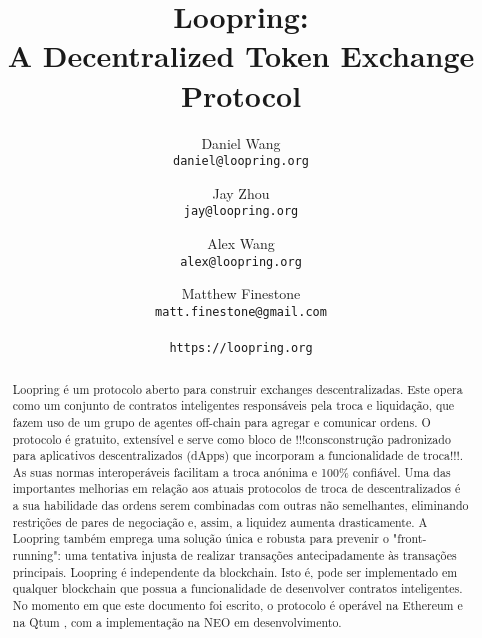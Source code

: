 \documentclass[UTF8,nofonts]{article}
\title{\textbf{Loopring:}\\\textbf{A Decentralized Token Exchange Protocol}}
\author{
  Daniel Wang\\
  \texttt{daniel@loopring.org}\\
  \and
  	Jay Zhou\\
  	\texttt{jay@loopring.org}\\
  	\and
  	Alex Wang\\
  	\texttt{alex@loopring.org}\\
  	\and
  	Matthew Finestone\\
  	\texttt{matt.finestone@gmail.com}\\ 
  \\
  \texttt{https://loopring.org}
 }
\begin{document}
\maketitle


\begin{abstract}
Loopring é um protocolo aberto para construir exchanges descentralizadas. Este opera como um conjunto de contratos inteligentes responsáveis pela troca e liquidação, que fazem uso de um grupo de agentes off-chain para agregar e comunicar ordens. O protocolo é gratuito, extensível e serve como bloco de !!!consconstrução padronizado para aplicativos descentralizados (dApps) que incorporam a funcionalidade de troca!!!. As suas normas interoperáveis facilitam a troca anónima e 100\% confiável. Uma das importantes melhorias em relação aos atuais protocolos de
troca de descentralizados é a sua habilidade das ordens serem combinadas com outras não semelhantes, eliminando restrições de pares de negociação e, assim, a liquidez aumenta drasticamente. A Loopring também emprega uma solução única e robusta para prevenir o "front-running": uma tentativa injusta de realizar transações antecipadamente às transações principais. Loopring é independente da blockchain. Isto é, pode ser implementado em qualquer blockchain que possua a funcionalidade de desenvolver contratos inteligentes. No momento em que este documento foi escrito, o protocolo é operável na Ethereum \cite{buterin2017ethereum} \cite{wood2014ethereum} e na Qtum
\cite{dai2017smart}, com a implementação na NEO \cite{atterlonn2018distributed} em desenvolvimento.
\end{abstract}
\end{document}
